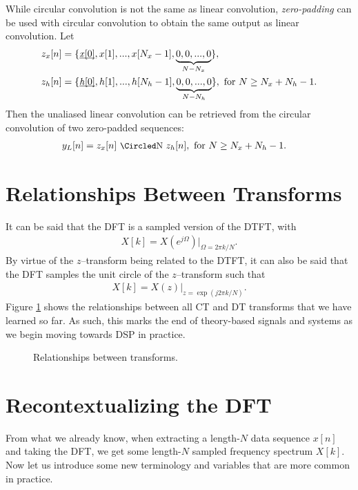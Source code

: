 \documentclass{report}
\begin{document}
While circular convolution is not the same as linear convolution, \emph{zero-padding} can be used with circular convolution to obtain 
the same output as linear convolution. Let 
\begin{align}
    z_x[n] &= \{\underbar{\emph{x}[0]},x[1],...,x[N_x-1], \underbrace{0,0,...,0}_{N-N_x}\}, \\
    z_h[n] &= \{\underbar{\emph{h}[0]},h[1],...,h[N_h-1], \underbrace{0,0,...,0}_{N-N_h}\}, \text{ for } N\geq N_x+N_h-1.
\end{align}
Then the unaliased linear convolution can be retrieved from the circular convolution of two zero-padded sequences:
\begin{align}
    y_L[n] &= z_x[n] \circconv{N} z_h[n], \text{ for } N\geq N_x+N_h-1.
\end{align}

\section{Relationships Between Transforms}
It can be said that the DFT is a sampled version of the DTFT, with 
\begin{align}
    X[k] = X(e^{j\Omega})\big|_{\Omega=2\pi k/N}.
\end{align}
By virtue of the $z$--transform being related to the DTFT, it can also be said that the DFT samples the unit circle of the $z$--transform such that 
\begin{align}
    X[k] = X(z)\big|_{z=\exp(j2\pi k/N)}.
\end{align}
Figure \ref{flowchart} shows the relationships between all CT and DT transforms that we have learned so far. As such, 
this marks the end of theory-based signals and systems as we begin moving towards DSP in practice.

\begin{figure}
    \caption{Relationships between transforms.}
    \label{flowchart}
    \centering
    
\end{figure}

\section{Recontextualizing the DFT}
From what we already know, when extracting a length-$N$ data sequence $x[n]$ and taking the DFT, we get some length-$N$ 
sampled frequency spectrum $X[k]$. Now let us introduce some new terminology and variables that are more common in practice.
\end{document}
